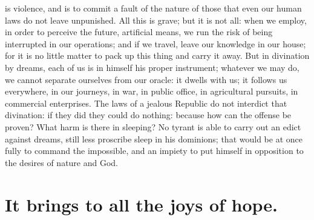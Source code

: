 \documentclass[12pt]{article}
\begin{document}
is violence, and is to commit a fault of the nature of those that even our
human laws do not leave unpunished. All this is grave; but it is not all: when
we employ, in order to perceive the future, artificial means, we run the risk
of being interrupted in our operations; and if we travel, leave our knowledge
in our house; for it is no little matter to pack up this thing and carry it
away. But in divination by dreams, each of us is in himself his proper
instrument; whatever we may do, we cannot separate ourselves from our oracle:
it dwells with us; it follows us everywhere, in our journeys, in war, in public
office, in agricultural pursuits, in commercial enterprises. The laws of a
jealous Republic do not interdict that divination: if they did they could do
nothing: because how can the offense be proven? What harm is there in sleeping?
No tyrant is able to carry out an edict against dreams, still less proscribe
sleep in his dominions; that would be at once fully to command the impossible,
and an impiety to put himself in opposition to the desires of nature and God.


\section{It brings to all the joys of hope.}
\end{document}
